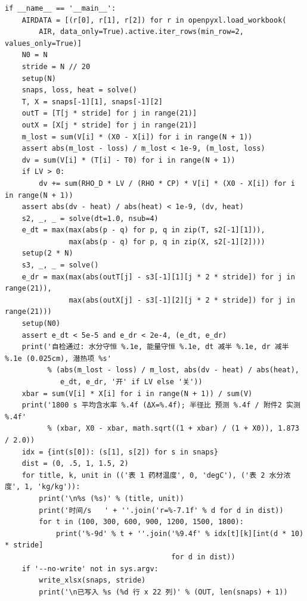 \documentclass[12pt,a4paper]{article}
\begin{document}
\begin{lstlisting}
if __name__ == '__main__':
    AIRDATA = [(r[0], r[1], r[2]) for r in openpyxl.load_workbook(
        AIR, data_only=True).active.iter_rows(min_row=2, values_only=True)]
    N0 = N                                            
    stride = N // 20                                  
    setup(N)
    snaps, loss, heat = solve()
    T, X = snaps[-1][1], snaps[-1][2]
    outT = [T[j * stride] for j in range(21)]
    outX = [X[j * stride] for j in range(21)]
    m_lost = sum(V[i] * (X0 - X[i]) for i in range(N + 1))
    assert abs(m_lost - loss) / m_lost < 1e-9, (m_lost, loss)
    dv = sum(V[i] * (T[i] - T0) for i in range(N + 1))
    if LV > 0:
        dv += sum(RHO_D * LV / (RHO * CP) * V[i] * (X0 - X[i]) for i in range(N + 1))
    assert abs(dv - heat) / abs(heat) < 1e-9, (dv, heat)
    s2, _, _ = solve(dt=1.0, nsub=4)
    e_dt = max(max(abs(p - q) for p, q in zip(T, s2[-1][1])),
               max(abs(p - q) for p, q in zip(X, s2[-1][2])))
    setup(2 * N)
    s3, _, _ = solve()
    e_dr = max(max(abs(outT[j] - s3[-1][1][j * 2 * stride]) for j in range(21)),
               max(abs(outX[j] - s3[-1][2][j * 2 * stride]) for j in range(21)))
    setup(N0)
    assert e_dt < 5e-5 and e_dr < 2e-4, (e_dt, e_dr)
    print('自检通过: 水分守恒 %.1e, 能量守恒 %.1e, dt 减半 %.1e, dr 减半 %.1e (0.025cm), 潜热项 %s'
          % (abs(m_lost - loss) / m_lost, abs(dv - heat) / abs(heat),
             e_dt, e_dr, '开' if LV else '关'))
    xbar = sum(V[i] * X[i] for i in range(N + 1)) / sum(V)
    print('1800 s 平均含水率 %.4f (ΔX=%.4f); 半径比 预测 %.4f / 附件2 实测 %.4f'
          % (xbar, X0 - xbar, math.sqrt((1 + xbar) / (1 + X0)), 1.873 / 2.0))
    idx = {int(s[0]): (s[1], s[2]) for s in snaps}
    dist = (0, .5, 1, 1.5, 2)
    for title, k, unit in (('表 1 药材温度', 0, 'degC'), ('表 2 水分浓度', 1, 'kg/kg')):
        print('\n%s (%s)' % (title, unit))
        print('时间/s   ' + ''.join('r=%-7.1f' % d for d in dist))
        for t in (100, 300, 600, 900, 1200, 1500, 1800):
            print('%-9d' % t + ''.join('%9.4f' % idx[t][k][int(d * 10) * stride]
                                       for d in dist))
    if '--no-write' not in sys.argv:
        write_xlsx(snaps, stride)
        print('\n已写入 %s (%d 行 x 22 列)' % (OUT, len(snaps) + 1))
\end{lstlisting}
\end{document}
